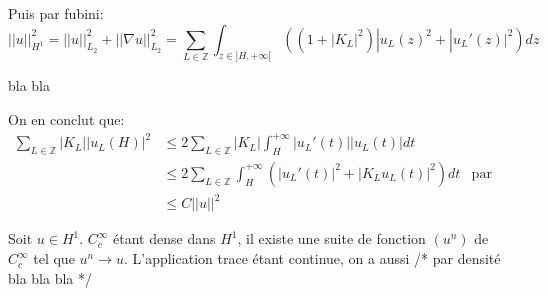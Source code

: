 \documentclass{article}
\begin{document}
Puis par fubini:
$$ ||u||_{H^1}^2 = ||u||_{L_2}^2 + ||\nabla u||_{L_2}^2 = \sum_{L\in\mathbb{Z}} \int_{z \in ]H, + \infty[} \left( (1+|K_L|^2)|u_L(z)^2 + |u_L'(z)|^2\right) dz$$

bla bla

On en conclut que:
\begin{align*}
\sum_{L \in \mathbb Z} |K_L| |u_L(H)|^2 & \leq 2 \sum_{L \in \mathbb Z} |K_L| \int_H^{+\infty} |u_L'(t)| |u_L(t)| dt \\
& \leq  2 \sum_{L \in \mathbb Z}  \int_H^{+\infty} (|u_L'(t)|^2 + |K_L u_L(t)|^2) dt & \text{par Cauchy Schwartz} \\
& \leq C ||u||^2
\end{align*}

Soit $u \in H^1$.
$C^\infty_c$ étant dense dans $H^1$, il existe une suite de fonction $(u^n)$ de $C^\infty_c$ tel  que $u^n \rightarrow u$.
L'application trace étant continue, on a aussi /* par densité bla bla bla */
\end{document}
